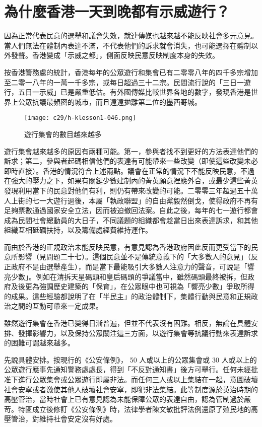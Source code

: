 \section{為什麼香港一天到晚都有示威遊行？}

因為正常代表民意的選舉和議會失效，就連傳媒也越來越不能反映社會多元意見。當人們無法在體制內表達不滿，不代表他們的訴求就會消失，也可能選擇在體制以外發聲。香港變成「示威之都」，側面反映民意反映制度本身的失效。

按香港警務處的統計，香港每年的公眾遊行和集會已有二零零八年的四千多宗增加至二零一八年的一萬一千多宗，或每日超過三十二宗。民間流行說的「三日一遊行，五日一示威」已是嚴重低估。有外國傳媒比較世界各地的數字，發現香港是世界上公眾抗議最頻密的城市，而且遠遠拋離第二位的墨西哥城。

\begin{figure}[htbp]
    \centering
    \texttt{[image: c29/h-klesson1-046.png]}
    \caption{遊行集會的數目越來越多} 
\end{figure}

遊行集會越來越多的原因有兩種可能。第一，參與者找不到更好的方法表達他們的訴求；第二，參與者起碼相信他們的表達有可能帶來一些改變（即使這些改變未必即時直接）。香港的情況符合上述兩點。議會在正常的情況下不能反映民意，不過在強大的壓力之下，如果有關鍵少數建制內的菁英願意裡應外合，或最少這些菁英發現利用當下的民意對他們有利，則仍有帶來改變的可能。二零零三年超過五十萬人上街的七一大遊行過後，本屬「執政聯盟」的自由黨毅然倒戈，使得政府不再有足夠票數通過國家安全立法，因而被迫撤回法案。自此之後，每年的七一遊行都會成為民間社會總動員的大日子，不同議題的組織都會趁當日出來表達訴求，和其他組織互相砥礪扶持，以及籌備處經費維持運作。

而由於香港的正規政治未能反映民意，有意見認為香港政府因此反而更受當下的民意所影響（見問題二十七）。這個民意並不是傳統意義下的「大多數人的意見」（反正政府不是由選舉產生），而是當下最能吸引大多數人注意力的聲音，可說是「響亮少數」。例如在清拆天星碼頭和皇后碼頭的爭議當中，雖然碼頭最終被拆，但政府及後更為強調歷史建築的「保育」，在公眾眼中也可視為「響亮少數」爭取所得的成果。這些經驗都說明了在「半民主」的政治體制下，集體行動與民意和正規政治之間的互動可帶來一定成果。

雖然遊行集會在香港已變得日漸普遍，但並不代表沒有困難。相反，無論在具體安排、發揮影響力，以及保持公眾關注這三方面，以遊行集會等抗議行動來表達訴求的困難可謂越來越多。

先說具體安排。按現行的《公安條例》， 50 人或以上的公眾集會或 30 人或以上的公眾遊行應事先通知警務處處長，得到「不反對通知書」後方可舉行。任何未經批准下進行公眾集會或公眾遊行即屬非法。而任何三人或以上集結在一起，意圖破壞社會安寧或者激使其他人破壞社會安寧，即犯非法集結。此等制度源於英治時期的高壓管治，當時社會上已有意見認為未能保障公眾的表達自由，認為管制過於嚴苛。特區成立後修訂《公安條例》時，法律學者陳文敏批評法例還原了殖民地的高壓管治，對維持社會安定沒有好處。

